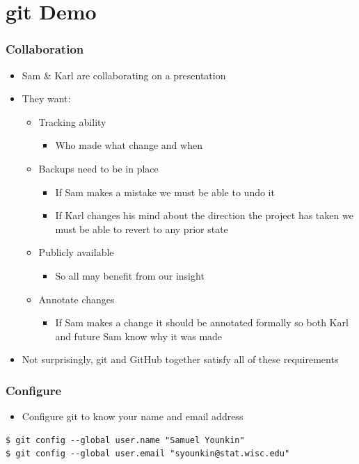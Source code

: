\documentclass[handout,13pt,compress,c]{beamer}
\newcommand{\bi}{\begin{itemize}}
\newcommand{\ei}{\end{itemize}}
\begin{document}
\section{git Demo}
\begin{frame}[fragile]
\frametitle{Collaboration}
\bi
\item Sam \& Karl are collaborating on a presentation
\item They want:
\bi
\item Tracking ability
\bi\item Who made what change and when\ei
\item Backups need to be in place
\bi\item If Sam makes a mistake we must be able to undo it
\item If Karl changes his mind about the direction the project has taken we must be able to revert to any prior state
\ei
\item Publicly available
\bi\item So all may benefit from our insight\ei
\item Annotate changes
\bi\item If Sam makes a change it should be annotated formally so both Karl and future Sam know why it was made\ei
\ei
\item Not surprisingly, git and GitHub together satisfy all of these requirements
\ei
\end{frame}
\begin{frame}[fragile]
\frametitle{Configure}
\bi
\item Configure git to know your name and email address
\ei
\begin{semiverbatim}
\begin{lstlisting}
$ git config --global user.name "Samuel Younkin"
$ git config --global user.email "syounkin@stat.wisc.edu"
\end{lstlisting}
\end{semiverbatim}
\end{frame}
\end{document}
